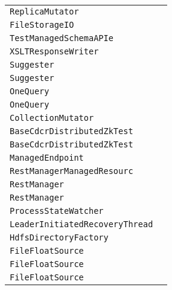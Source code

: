 \begin{center}
\begin{tabular}{ll}
\lstinline/ReplicaMutator/&\raisebox{0pt}{\lstinline/DocCollectioncheckAndCompleteShardSplit()/}\\
\lstinline/FileStorageIO/&\raisebox{0pt}{\lstinline/configure()/}\\
\lstinline/TestManagedSchemaAPIe/&\raisebox{0pt}{\lstinline/addStringField(String)/}\\
\lstinline/XSLTResponseWriter/&\raisebox{0pt}{\lstinline/init(NamedListn)/}\\
\lstinline/Suggester/&\raisebox{0pt}{\lstinline/SpellingResultgetSuggestions(SpellingOptionsoptions)/}\\
\lstinline/Suggester/&\raisebox{0pt}{\lstinline/SpellingResultgetSuggestions(SpellingOptionsoptions)/}\\
\lstinline/OneQuery/&\raisebox{0pt}{\lstinline/run()/}\\
\lstinline/OneQuery/&\raisebox{0pt}{\lstinline/run()/}\\
\lstinline/CollectionMutator/&\raisebox{0pt}{\lstinline/checkKeyExistence(ZkNodeProp)/}\\
\lstinline/BaseCdcrDistributedZkTest/&\raisebox{0pt}{\lstinline/waitForReplicationToComplete(String)/}\\
\lstinline/BaseCdcrDistributedZkTest/&\raisebox{0pt}{\lstinline/waitForReplicationToComplete(String)/}\\
\lstinline/ManagedEndpoint/&\raisebox{0pt}{\lstinline/ObjectparseJsonFromRequestBody()/}\\
\lstinline/RestManagerManagedResourc/&\raisebox{0pt}{\lstinline/applyUpdatesToManagedData(Objectupdates)/}\\
\lstinline/RestManager/&\raisebox{0pt}{\lstinline/attachManagedResource(ManagedResource)/}\\
\lstinline/RestManager/&\raisebox{0pt}{\lstinline/attachManagedResource(ManagedResource)/}\\
\lstinline/ProcessStateWatcher/&\raisebox{0pt}{\lstinline/process(WatchedEventevent)/}\\
\lstinline/LeaderInitiatedRecoveryThread/&\raisebox{0pt}{\lstinline/booleanpublishDownState(String)/}\\
\lstinline/HdfsDirectoryFactory/&\raisebox{0pt}{\lstinline/initKerberos()/}\\
\lstinline/FileFloatSource/&\raisebox{0pt}{\lstinline/getFloats()/}\\
\lstinline/FileFloatSource/&\raisebox{0pt}{\lstinline/getFloats()/}\\
\lstinline/FileFloatSource/&\raisebox{0pt}{\lstinline/getFloats()/}\\

\end{tabular}
\end{center}
